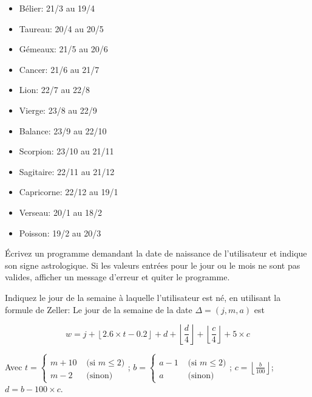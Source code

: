 \documentclass[10pt]{article}\usepackage[enonce]{exemptty}
\begin{document}
\begin{minipage}{.3\linewidth}
  \begin{itemize}
  \item Bélier: 21/3 au 19/4
  \item Taureau: 20/4 au 20/5
  \item Gémeaux: 21/5 au 20/6
  \item Cancer: 21/6 au 21/7
  \end{itemize}
\end{minipage}\hfill\begin{minipage}{.3\linewidth}
  \begin{itemize}
  \item Lion: 22/7 au 22/8
  \item Vierge: 23/8 au 22/9
  \item Balance: 23/9 au 22/10
  \item Scorpion: 23/10 au 21/11
  \end{itemize}
\end{minipage}\hfill\begin{minipage}{.3\linewidth}
  \begin{itemize}
  \item Sagitaire: 22/11 au 21/12
  \item Capricorne: 22/12 au 19/1
  \item Verseau: 20/1 au 18/2
  \item Poisson: 19/2 au 20/3
  \end{itemize}
\end{minipage}

\Question Écrivez un programme demandant la date de naissance de l'utilisateur
et indique son signe astrologique. Si les valeurs entrées pour le jour ou le
mois ne sont pas valides, afficher un message d'erreur et quiter le programme.

\Question Indiquez le jour de la semaine à laquelle l'utilisateur est né, en
utilisant la formule de Zeller: Le jour de la semaine de la date
$\Delta=(j,m,a)$ est 

$$w=j+\left\lfloor 2.6\times t - 0.2 \right\rfloor + d + 
 \left\lfloor \frac{d}{4} \right\rfloor + 
 \left\lfloor \frac{c}{4} \right\rfloor + 5\times c
$$

Avec $\displaystyle t=\left\{\begin{array}{ll}\\
    m+10&\mbox{ (si } m\leq 2)\\
    m-2&\mbox{ (sinon)}
  \end{array}\right.$;  
  $\displaystyle
  b=\left\{\begin{array}{ll}\\
    a-1&\textrm{ (si } m\leq 2)\\
    a&\textrm{ (sinon)}
  \end{array}\right.$; 
  $\displaystyle
  c=\left\lfloor\frac{b}{100}\right\rfloor$;
  $\displaystyle
  d=b-100\times c$.
  
\end{document}
